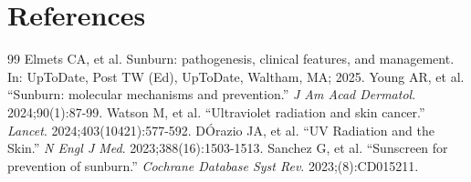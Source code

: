 \section*{References}
\begin{thebibliography}{99}
 Elmets CA, et al. Sunburn: pathogenesis, clinical features, and management. In: UpToDate, Post TW (Ed), UpToDate, Waltham, MA; 2025.
 Young AR, et al. ``Sunburn: molecular mechanisms and prevention.'' \emph{J Am Acad Dermatol}. 2024;90(1):87-99.
 Watson M, et al. ``Ultraviolet radiation and skin cancer.'' \emph{Lancet}. 2024;403(10421):577-592.
 D\'Orazio JA, et al. ``UV Radiation and the Skin.'' \emph{N Engl J Med}. 2023;388(16):1503-1513.
 Sanchez G, et al. ``Sunscreen for prevention of sunburn.'' \emph{Cochrane Database Syst Rev}. 2023;(8):CD015211.
\end{thebibliography}

